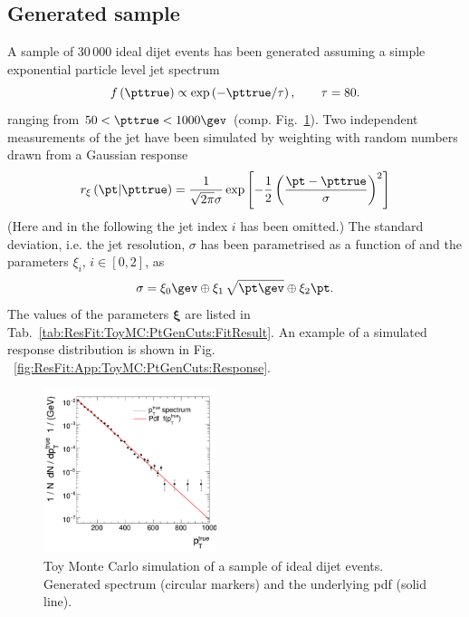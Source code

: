 \subsection{Generated sample}\label{sec:ResFit:App:ToyMC:Sample}

A sample of $30\,000$ ideal dijet events has been generated assuming a
simple exponential particle level jet \pt spectrum
\begin{equation}
  \label{eq:ResFit:ToyMC:Spectrum}
  f\left(\pttrue\right) \propto \exp\left(-\pttrue / \tau\right),
  \qquad \tau = 80.
\end{equation}
ranging from \mbox{$50 < \pttrue < 1000\gev$} (comp. Fig.~\ref{fig:ResFit:App:ToyMC:Sample:Spectrum}).
Two independent measurements of the jet \pt have been simulated by
weighting \pttrue with random numbers drawn from a Gaussian response
\begin{equation}
  \label{eq:ResFit:ToyMC:Response}
  r_{\mathbf{\xi}}\left(\pt|\pttrue\right) = 
  \frac{1}{\sqrt{2\pi}\sigma}\exp\left[-\frac{1}{2}\left(\frac{\pt - \pttrue}{\sigma}\right)^{2}\right]
\end{equation}
(Here and in the following the jet index $i$ has been omitted.)
The standard deviation, i.e. the jet resolution, $\sigma$ has been parametrised as a function of \pttrue and
the parameters $\xi_{i}$, \mbox{$i\in [0,2]$}, as
\begin{equation}
  \label{eq:ResFit:ToyMC:Sigma}
  \sigma = \xi_{0}\gev
  \oplus \xi_{1}\,\sqrt{\pt\gev}\oplus \xi_{2}\pt.
\end{equation}
The values of the parameters $\mathbf{\xi}$ are listed in
Tab.~\ref{tab:ResFit:ToyMC:PtGenCuts:FitResult}.
An example of a simulated response distribution is shown in Fig. ~\ref{fig:ResFit:App:ToyMC:PtGenCuts:Response}.

\begin{figure}[ht]
  \centering
  \includegraphics[width=0.45\textwidth]{figures/resFit_ToyMC_PtGenCuts_SpectrumLog}
  \caption{Toy Monte Carlo simulation of a sample of ideal dijet events.
    Generated \pttrue spectrum (circular markers) and the underlying pdf (solid line).}
  \label{fig:ResFit:App:ToyMC:Sample:Spectrum}
\end{figure}


